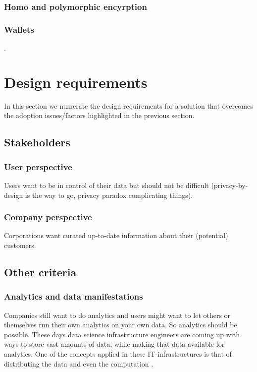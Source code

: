 \documentclass{article}
\begin{document}
\subsubsection{Homo and polymorphic encyrption}
\subsubsection{Wallets}


.


\section{Design requirements}
In this section we numerate the design requirements for a solution that overcomes the adoption issues/factors highlighted in the previous section.

\subsection{Stakeholders}
\subsubsection{User perspective}
Users want to be in control of their data but should not be difficult (privacy-by-design is the way to go, privacy paradox complicating things). 

\subsubsection{Company perspective}
Corporations want curated up-to-date information about their (potential) customers.

\subsection{Other criteria}
\subsubsection{Analytics and data manifestations}
Companies still want to do analytics and users might want to let others or themselves run their own analytics on your own data. So analytics should be possible. These days data science infrastructure engineers are coming up with ways to store vast amounts of data, while making that data available for analytics. One of the concepts applied in these IT-infrastructures is that of distributing the data and even the computation \cite{kleppmann2017designing}.
\end{document}
